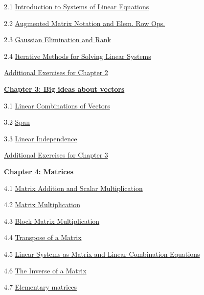 \documentclass{ximera}
\begin{document}
2.1	\href{https://ximera.osu.edu/oerlinalg/LinearAlgebra/SYS-0020/main}{Introduction to Systems of Linear Equations}
	
2.2	\href{https://ximera.osu.edu/oerlinalg/LinearAlgebra/SYS-0030/main}{Augmented Matrix Notation and Elem. Row Ops.}
	
2.3	\href{https://ximera.osu.edu/oerlinalg/LinearAlgebra/SYS-0030/main}{Gaussian Elimination and Rank}
	
2.4	\href{https://ximera.osu.edu/oerlinalg/LinearAlgebra/SYS-0040/main}{Iterative Methods for Solving Linear Systems}
	
\href{https://ximera.osu.edu/oerlinalg/LinearAlgebra/SUPX-0020/main}{Additional Exercises for Chapter 2}
	
\href{https://ximera.osu.edu/oerlinalg/LinearAlgebra/XLAChapter_bigIdeas/main}{\textbf{Chapter 3: Big ideas about vectors}}
	
3.1	\href{https://ximera.osu.edu/oerlinalg/LinearAlgebra/VEC-0040/main}{Linear Combinations of Vectors}
	
3.2	\href{https://ximera.osu.edu/oerlinalg/LinearAlgebra/VEC-0090/main}{Span}
	
3.3	\href{https://ximera.osu.edu/oerlinalg/LinearAlgebra/VEC-0100/main}{Linear Independence}
	
\href{https://ximera.osu.edu/oerlinalg/LinearAlgebra/SUPX-0030/main}{Additional Exercises for Chapter 3}
	
\href{https://ximera.osu.edu/oerlinalg/LinearAlgebra/XLAChapter_matrices/main}{\textbf{Chapter 4: Matrices}}
	
4.1	\href{https://ximera.osu.edu/oerlinalg/LinearAlgebra/MAT-0010/main}{Matrix Addition and Scalar Multiplication}
	
4.2	\href{https://ximera.osu.edu/oerlinalg/LinearAlgebra/MAT-0020/main}{Matrix Multiplication}
	
4.3	\href{https://ximera.osu.edu/oerlinalg/LinearAlgebra/MAT-0023/main}{Block Matrix Multiplication}
	
4.4	\href{https://ximera.osu.edu/oerlinalg/LinearAlgebra/MAT-0025/main}{Transpose of a Matrix}
	
4.5	\href{https://ximera.osu.edu/oerlinalg/LinearAlgebra/MAT-0030/main}{Linear Systems as Matrix and Linear Combination Equations}
	
4.6	\href{https://ximera.osu.edu/oerlinalg/LinearAlgebra/MAT-0050/main}{The Inverse of a Matrix}
	
4.7	\href{https://ximera.osu.edu/oerlinalg/LinearAlgebra/MAT-0060/main}{Elementary matrices}
	
\end{document}

